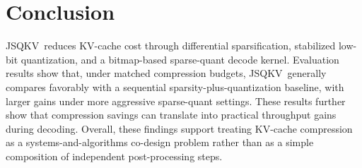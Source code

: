 \documentclass[runningheads]{llncs}
\newcommand{\method}{JSQKV}
\begin{document}


\section{Conclusion}
\label{sec:conclusion}

\method\ reduces KV-cache cost through differential sparsification, stabilized low-bit quantization, and a bitmap-based sparse-quant decode kernel. Evaluation results show that, under matched compression budgets, \method\ generally compares favorably with a sequential sparsity-plus-quantization baseline, with larger gains under more aggressive sparse-quant settings. These results further show that compression savings can translate into practical throughput gains during decoding. Overall, these findings support treating KV-cache compression as a systems-and-algorithms co-design problem rather than as a simple composition of independent post-processing steps.



\appendix
\setcounter{section}{0}
\renewcommand{\thesection}{Appendix \arabic{section}}


% 
\end{document}
